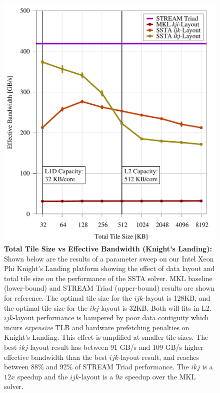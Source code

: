 \documentclass{sig-alternate-05-2015}
\begin{document}
\begin{figure}[!h]
    \centering
    \caption{
      \textbf{Total Tile Size vs Effective Bandwidth (Knight's Landing):}
      Shown below are the results of a parameter sweep on our Intel Xeon Phi
        Knight's Landing platform showing the effect of data layout and total
        tile size on the performance of the SSTA solver.
      MKL baseline (lower-bound) and STREAM Triad (upper-bound) results are shown
        for reference.
      The optimal tile size for the \(ijk\)-layout is 128KB, and the optimal
        tile size for the \(ikj\)-layout is 32KB.
      Both will fits in L2.
      \(ijk\)-layout performance is hampered by poor data contiguity which incurs
        \emph{expensive} TLB and hardware prefetching penalties on Knight's
        Landing.
      This effect is amplified at smaller tile sizes.
      The best \(ikj\)-layout result has between 91 GB/s and 109 GB/s higher
        effective bandwidth than the best \(ijk\)-layout result, and reaches
        between 88\% and 92\% of STREAM Triad performance.
      The \(ikj\) is a \(12x\) speedup and the \(ijk\)-layout is a \(9x\)
        speedup over the MKL solver.
    }
    \label{fig:results:tile_size_knl}
    \includegraphics[width=0.95\columnwidth]{figures/post_tsb_tw_sweep_full_matrix_double_precision_production_carl_knl_7210_09_02_2016_64pus.pdf}
\end{figure}
\end{document}
